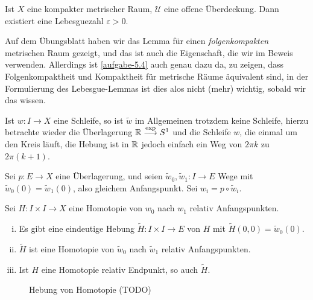 \begin{lemma*}\label{lm:lebesgue}
    Ist $X$ eine kompakter metrischer Raum,  $\mathcal{U}$ eine offene Überdeckung. Dann existiert eine Lebesguezahl $ε>0$.
\end{lemma*}

\begin{remark*}
    Auf dem Übungsblatt haben wir das Lemma für einen \textit{folgenkompakten} metrischen Raum gezeigt, und das ist auch die Eigenschaft, die wir im Beweis verwenden. Allerdings ist \autoref{aufgabe-5.4} auch genau dazu da, zu zeigen, dass Folgenkompaktheit und Kompaktheit für metrische Räume äquivalent sind, in der Formulierung des Lebesgue-Lemmas ist dies alos nicht (mehr) wichtig, sobald wir das wissen.
\end{remark*}

\begin{remark}
    Ist $w\colon  I \to  X$ eine Schleife, so ist $\tilde{w}$ im Allgemeinen trotzdem keine Schleife, hierzu betrachte wieder die Überlagerung $\mathbb{R} \stackrel{\exp }{\longrightarrow} S^1$ und die Schleife $w$, die einmal um den Kreis läuft, die Hebung ist in $\mathbb{R}$ jedoch einfach ein Weg von $2\pi k$ zu $2\pi(k+1)$.
\end{remark}

\begin{theorem}[Homotopieliftungssatz]\label{thm:homotopieliftungssatz}
    Sei $p\colon  E \to  X$ eine Überlagerung, und seien $\tilde{w}_0, \tilde{w}_1\colon  I \to  E$ Wege mit $\tilde{w}_0(0) = \tilde{w}_1(0)$, also gleichem Anfangspunkt. Sei $w_i = p \circ  \tilde{w}_i$.

    Sei $H\colon  I \times I \to  X$ eine Homotopie von $w_0$ nach $w_1$ relativ Anfangspunkten.

    \begin{enumerate}[i)]
        \item Es gibt eine eindeutige Hebung $\tilde{H}\colon  I \times I \to  E$ von $H$ mit  $\tilde{H}(0,0) = \tilde{w}_0(0)$.
        \item $\tilde{H}$ ist eine Homotopie von $\tilde{w}_0$ nach $\tilde{w}_1$ relativ Anfangspunkten.
        \item Ist $H$ eine Homotopie relativ Endpunkt, so auch  $\tilde{H}$.
    \end{enumerate}
\end{theorem}


\begin{figure}[ht]
    \centering
    \caption{Hebung von Homotopie (TODO)}
    \label{fig:hebung-von-homotopie}
\end{figure}


